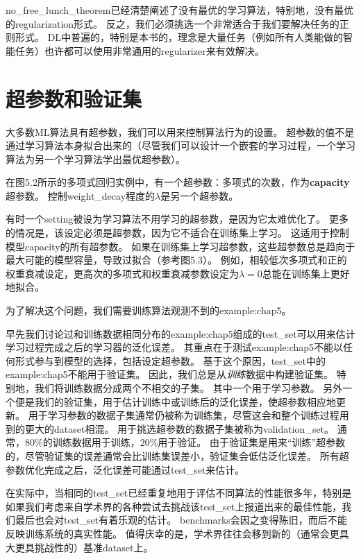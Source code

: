 \gls{no_free_lunch_theorem}已经清楚阐述了没有最优的学习算法，特别地，没有最优的\gls{regularization}形式。
反之，我们必须挑选一个非常适合于我们要解决任务的正则形式。
\gls{DL}中普遍的，特别是本书的，理念是大量任务（例如所有人类能做的智能任务）也许都可以使用非常通用的\gls{regularizer}来有效解决。

\section{超参数和验证集}
\label{sec:hyperparameters_and_validation_sets}
大多数\gls{ML}算法具有超参数，我们可以用来控制算法行为的设置。
超参数的值不是通过学习算法本身拟合出来的（尽管我们可以设计一个嵌套的学习过程，一个学习算法为另一个学习算法学出最优超参数）。

在图5.2所示的多项式回归实例中，有一个超参数：多项式的次数，作为\textbf{\gls{capacity}}超参数。
控制\gls{weight_decay}程度的$\lambda$是另一个超参数。

有时一个\gls{setting}被设为学习算法不用学习的超参数，是因为它太难优化了。
更多的情况是，该设定必须是超参数，因为它不适合在训练集上学习。
这适用于控制模型\gls{capacity}的所有超参数。
如果在训练集上学习超参数，这些超参数总是趋向于最大可能的模型容量，导致过拟合（参考图5.3）。
例如，相较低次多项式和正的权重衰减设定，更高次的多项式和权重衰减参数设定为$\lambda=0$总能在训练集上更好地拟合。


为了解决这个问题，我们需要训练算法观测不到的\gls{example:chap5}。

早先我们讨论过和训练数据相同分布的\gls{example:chap5}组成的\gls{test_set}可以用来估计学习过程完成之后的学习器的泛化误差。
其重点在于测试\gls{example:chap5}不能以任何形式参与到模型的选择，包括设定超参数。
基于这个原因，\gls{test_set}中的\gls{example:chap5}不能用于验证集。
因此，我们总是从\emph{训练}数据中构建验证集。
特别地，我们将训练数据分成两个不相交的子集。
其中一个用于学习参数。
另外一个便是我们的验证集，用于估计训练中或训练后的泛化误差，使超参数相应地更新。
用于学习参数的数据子集通常仍被称为训练集，尽管这会和整个训练过程用到的更大的\gls{dataset}相混。
用于挑选超参数的数据子集被称为\gls{validation_set}。
通常，$80\%$的训练数据用于训练，$20\%$用于验证。
由于验证集是用来``训练''超参数的，尽管验证集的误差通常会比训练集误差小，验证集会低估泛化误差。
所有超参数优化完成之后，泛化误差可能通过\gls{test_set}来估计。

在实际中，当相同的\gls{test_set}已经重复地用于评估不同算法的性能很多年，特别是如果我们考虑来自学术界的各种尝试去挑战该\gls{test_set}上报道出来的最佳性能，我们最后也会对\gls{test_set}有着乐观的估计。
\gls{benchmarks}会因之变得陈旧，而后不能反映训练系统的真实性能。
值得庆幸的是，学术界往往会移到新的（通常会更具大更具挑战性的）基准\gls{dataset}上。

